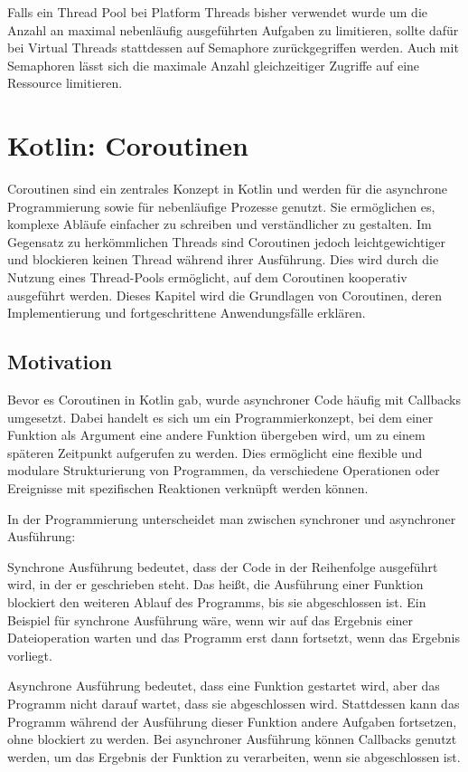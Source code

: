 \documentclass[fontsize=12pt,paper=a4,twoside=semi,parskip=half-,headsepline,headinclude]{scrreprt}
\begin{document}
Falls ein Thread Pool bei Platform Threads bisher verwendet wurde um die Anzahl an maximal nebenläufig ausgeführten Aufgaben zu limitieren, sollte dafür bei Virtual Threads stattdessen auf Semaphore zurückgegriffen werden. Auch mit Semaphoren lässt sich die maximale Anzahl gleichzeitiger Zugriffe auf eine Ressource limitieren.

\newpage

\section{Kotlin: Coroutinen}

Coroutinen sind ein zentrales Konzept in Kotlin und werden für die asynchrone Programmierung sowie für nebenläufige Prozesse genutzt. Sie ermöglichen es, komplexe Abläufe einfacher zu schreiben und verständlicher zu gestalten. Im Gegensatz zu herkömmlichen Threads sind Coroutinen jedoch leichtgewichtiger und blockieren keinen Thread während ihrer Ausführung. Dies wird durch die Nutzung eines Thread-Pools ermöglicht, auf dem Coroutinen kooperativ ausgeführt werden. Dieses Kapitel wird die Grundlagen von Coroutinen, deren Implementierung und fortgeschrittene Anwendungsfälle erklären.



\subsection{Motivation}

Bevor es Coroutinen in Kotlin gab, wurde asynchroner Code häufig mit Callbacks umgesetzt. Dabei handelt es sich um ein Programmierkonzept, bei dem einer Funktion als Argument eine andere Funktion übergeben wird, um zu einem späteren Zeitpunkt aufgerufen zu werden. Dies ermöglicht eine flexible und modulare Strukturierung von Programmen, da verschiedene Operationen oder Ereignisse mit spezifischen Reaktionen verknüpft werden können. 

In der Programmierung unterscheidet man zwischen synchroner und asynchroner Ausführung:

Synchrone Ausführung bedeutet, dass der Code in der Reihenfolge ausgeführt wird, in der er geschrieben steht. Das heißt, die Ausführung einer Funktion blockiert den weiteren Ablauf des Programms, bis sie abgeschlossen ist. Ein Beispiel für synchrone Ausführung wäre, wenn wir auf das Ergebnis einer Dateioperation warten und das Programm erst dann fortsetzt, wenn das Ergebnis vorliegt.

Asynchrone Ausführung bedeutet, dass eine Funktion gestartet wird, aber das Programm nicht darauf wartet, dass sie abgeschlossen wird. Stattdessen kann das Programm während der Ausführung dieser Funktion andere Aufgaben fortsetzen, ohne blockiert zu werden. Bei asynchroner Ausführung können Callbacks genutzt werden, um das Ergebnis der Funktion zu verarbeiten, wenn sie abgeschlossen ist.
\end{document}
